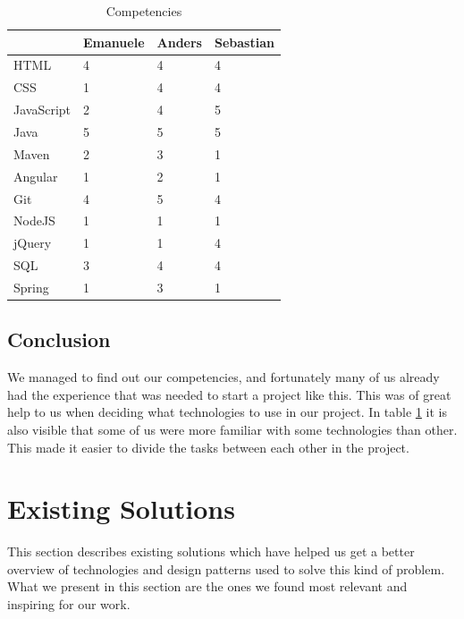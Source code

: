 \begin{table}
\begin{center}
\begin{tabular}{ l | l | l | l }
  \hline
  & Emanuele & Anders & Sebastian \\ \hline
  HTML & 4 & 4 & 4 \\
  CSS  & 1 & 4 & 4 \\
  JavaScript & 2 & 4 & 5 \\
  Java & 5 & 5 & 5 \\
  Maven & 2 & 3 & 1 \\
  Angular & 1 & 2 & 1 \\
  Git & 4 & 5 & 4 \\
  NodeJS & 1 & 1 & 1 \\
  jQuery & 1 & 1 & 4 \\
  SQL & 3 & 4 & 4 \\
  Spring & 1 & 3 & 1 \\
  \hline
\end{tabular}
\end{center}
\caption{Competencies}
\label{table:competencies}
\end{table}

\subsection{Conclusion}

We managed to find out our competencies, and fortunately many of us already had the experience that was needed to start a project like this.
This was of great help to us when deciding what technologies to use in our project.
In table \ref{table:competencies} it is also visible that some of us were more familiar with some technologies than other.
This made it easier to divide the tasks between each other in the project.
\fi

\section{Existing Solutions}
\label{section:existing-solutions}

This section describes existing solutions which have helped us get a better overview of technologies and
design patterns used to solve this kind of problem. What we present in this section are the ones we found
most relevant and inspiring for our work.


